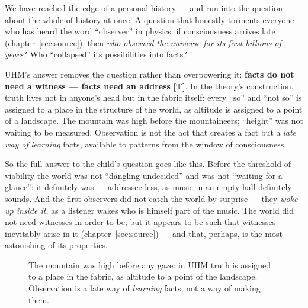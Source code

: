 \documentclass[11pt,letterpaper]{article}
\newcommand{\stT}{\textbf{[T]}\xspace}
\begin{document}
We have reached the edge of a personal history --- and run into the
question about the whole of history at once.
A question that honestly torments everyone who has heard the word
``observer'' in physics: if consciousness arrives late
(chapter~\ref{sec:source}), then \emph{who observed the universe for
its first billions of years}? Who ``collapsed'' its possibilities
into facts?

UHM's answer removes the question rather than overpowering it:
\textbf{facts do not need a witness --- facts need an address} \stT.
In the theory's construction, truth lives not in anyone's head but in
the fabric itself: every ``so'' and ``not so'' is assigned to a place
in the structure of the world, as altitude is assigned to a point of
a landscape. The mountain was high before the mountaineers;
``height'' was not waiting to be measured. Observation is not the act
that creates a fact but a \emph{late way of learning} facts,
available to patterns from the window of consciousness.

So the full answer to the child's question goes like this. Before the
threshold of viability the world was not ``dangling undecided'' and
was not ``waiting for a glance'': it definitely was ---
addressee-less, as music in an empty hall definitely sounds. And the
first observers did not catch the world by surprise --- they
\emph{woke up inside it}, as a listener wakes who is himself part of
the music. The world did not need witnesses in order to be; but it
appears to be such that witnesses inevitably arise in it
(chapter~\ref{sec:source}) --- and that, perhaps, is the most
astonishing of its properties.

\begin{figure}[H]
\centering
{}
\caption{The mountain was high before any gaze: in UHM truth is
assigned to a place in the fabric, as altitude to a point of the
landscape. Observation is a late way of \emph{learning} facts, not a
way of making them.}
\label{fig:mountain}
\end{figure}
\end{document}
